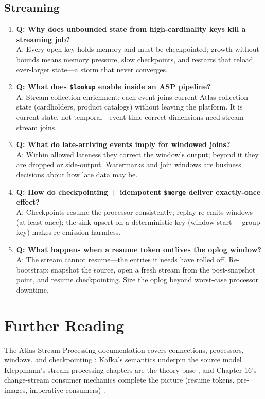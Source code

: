 \subsection{Streaming}
\begin{enumerate}
    \item \textbf{Q: Why does unbounded state from high-cardinality keys kill a streaming job?}\\
    A: Every open key holds memory and must be checkpointed; growth without bounds means memory pressure, slow checkpoints, and restarts that reload ever-larger state---a storm that never converges.

    \item \textbf{Q: What does \texttt{\$lookup} enable inside an ASP pipeline?}\\
    A: Stream-collection enrichment: each event joins current Atlas collection state (cardholders, product catalogs) without leaving the platform. It is current-state, not temporal---event-time-correct dimensions need stream-stream joins.

    \item \textbf{Q: What do late-arriving events imply for windowed joins?}\\
    A: Within allowed lateness they correct the window's output; beyond it they are dropped or side-output. Watermarks and join windows are business decisions about how late data may be.

    \item \textbf{Q: How do checkpointing + idempotent \texttt{\$merge} deliver exactly-once effect?}\\
    A: Checkpoints resume the processor consistently; replay re-emits windows (at-least-once); the sink upsert on a deterministic key (window start + group key) makes re-emission harmless.

    \item \textbf{Q: What happens when a resume token outlives the oplog window?}\\
    A: The stream cannot resume---the entries it needs have rolled off. Re-bootstrap: snapshot the source, open a fresh stream from the post-snapshot point, and resume checkpointing. Size the oplog beyond worst-case processor downtime.
\end{enumerate}

\section{Further Reading}
The Atlas Stream Processing documentation covers connections, processors, windows, and checkpointing \cite{mongodbStreamProcessingDocs}; Kafka's semantics underpin the source model \cite{apacheKafkaRepo}. Kleppmann's stream-processing chapters are the theory base \cite{kleppmann2017ddia}, and Chapter 16's change-stream consumer mechanics complete the picture (resume tokens, pre-images, imperative consumers) \cite{mongodbChangeStreamsDocs}.

